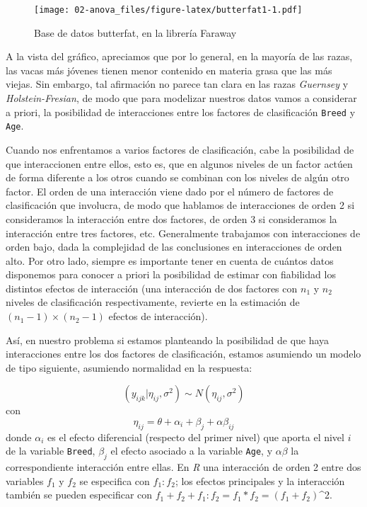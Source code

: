 \documentclass[
]{book}
\begin{document}
\begin{figure}
\centering
\texttt{[image: 02-anova\_files/figure-latex/butterfat1-1.pdf]}
\caption{\label{fig:butterfat1}Base de datos butterfat, en la librería Faraway}
\end{figure}

A la vista del gráfico, apreciamos que por lo general, en la mayoría de las razas, las vacas más jóvenes tienen menor contenido en materia grasa que las más viejas. Sin embargo, tal afirmación no parece tan clara en las razas \emph{Guernsey} y \emph{Holstein-Fresian}, de modo que para modelizar nuestros datos vamos a considerar a priori, la posibilidad de interacciones entre los factores de clasificación \texttt{Breed} y \texttt{Age}.

Cuando nos enfrentamos a varios factores de clasificación, cabe la posibilidad de que interaccionen entre ellos, esto es, que en algunos niveles de un factor actúen de forma diferente a los otros cuando se combinan con los niveles de algún otro factor. El orden de una interacción viene dado por el número de factores de clasificación que involucra, de modo que hablamos de interacciones de orden 2 si consideramos la interacción entre dos factores, de orden 3 si consideramos la interacción entre tres factores, etc. Generalmente trabajamos con interacciones de orden bajo, dada la complejidad de las conclusiones en interacciones de orden alto. Por otro lado, siempre es importante tener en cuenta de cuántos datos disponemos para conocer a priori la posibilidad de estimar con fiabilidad los distintos efectos de interacción (una interacción de dos factores con \(n_1\) y \(n_2\) niveles de clasificación respectivamente, revierte en la estimación de \((n_1-1)\times(n_2-1)\) efectos de interacción).

Así, en nuestro problema si estamos planteando la posibilidad de que haya interacciones entre los dos factores de clasificación, estamos asumiendo un modelo de tipo siguiente, asumiendo normalidad en la respuesta:

\[(y_{ijk}|\eta_{ij},\sigma^2) \sim N(\eta_{ij},\sigma^2)\]
con
\[\eta_{ij}=\theta+ \alpha_i + \beta_j + \alpha\beta_{ij}\]
donde \(\alpha_i\) es el efecto diferencial (respecto del primer nivel) que aporta el nivel \(i\) de la variable \texttt{Breed}, \(\beta_j\) el efecto asociado a la variable \texttt{Age}, y \(\alpha\beta\) la correspondiente interacción entre ellas. En \emph{R} una interacción de orden 2 entre dos variables \(f_1\) y \(f_2\) se especifica con \(f_1:f_2\); los efectos principales y la interacción también se pueden especificar con \(f_1+f_2+f_1:f_2=f_1*f_2=(f_1+f_2)\)\^{}2.
\end{document}
